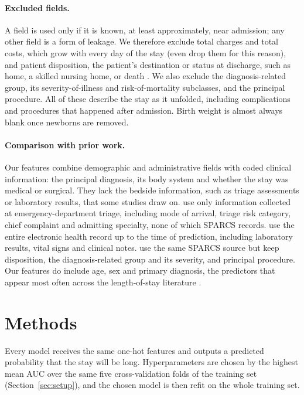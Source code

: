 \documentclass{article}
\begin{document}
\paragraph{Excluded fields.}
A field is used only if it is known, at least approximately, near admission;
any other field is a form of leakage. We therefore exclude
total charges and total costs, which grow with every day of the stay (even
\citet{jain2024} drop them for this reason), and patient disposition, the
patient's destination or status at discharge, such as home, a skilled nursing
home, or death \citep{sparcs}.
We also exclude the diagnosis-related group, its severity-of-illness and
risk-of-mortality subclasses, and the principal procedure. All of these
describe the stay as it unfolded, including complications and procedures that
happened after admission. Birth weight is
almost always blank once newborns are removed.

\paragraph{Comparison with prior work.}
Our features combine demographic and administrative fields with coded clinical
information: the principal diagnosis, its body system and whether the stay
was medical or surgical. They lack the bedside information, such as triage
assessments or laboratory results, that some studies draw on. \citet{zeleke2023} use only
information collected at emergency-department triage, including mode of
arrival, triage risk category, chief complaint and admitting specialty, none of
which SPARCS records. \citet{rajkomar2018} use the entire electronic health
record up to the time of prediction, including laboratory results, vital signs
and clinical notes. \citet{jain2024} use the same SPARCS source but keep
disposition, the diagnosis-related group and its severity, and principal
procedure. Our features do include age, sex and primary diagnosis, the
predictors that appear most often across the length-of-stay literature
\citep{stone2022}.

\section{Methods}
\label{sec:methods}

Every model receives the same one-hot features and outputs a predicted
probability that the stay will be long. Hyperparameters are chosen by the
highest mean AUC over the same five cross-validation folds of the training set
(Section~\ref{sec:setup}), and the chosen
model is then refit on the whole training set.
\end{document}
